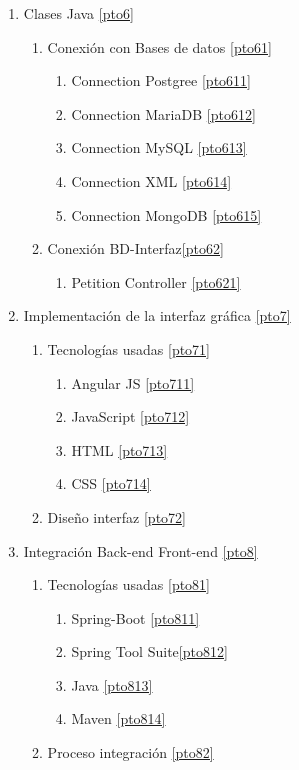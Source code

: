 \documentclass[12pt,a4paper]{article}
\begin{document}
\begin{enumerate}
\item Clases Java \ref{pto6}
	\begin{enumerate}[label*=\arabic*.]
	\item Conexión con Bases de datos \ref{pto61}
		\begin{enumerate}[label*=\arabic*.]
		\item Connection Postgree \ref{pto611}
		\item Connection MariaDB \ref{pto612}
		\item Connection MySQL \ref{pto613}
		\item Connection XML \ref{pto614}
		\item Connection MongoDB \ref{pto615}
		\end{enumerate}
	\item Conexión BD-Interfaz\ref{pto62}
		\begin{enumerate}[label*=\arabic*.]
		\item Petition Controller \ref{pto621}
		\end{enumerate}
	\end{enumerate}

\item Implementación de la interfaz gráfica  \ref{pto7}
		\begin{enumerate}[label*=\arabic*.]
		\item Tecnologías usadas \ref{pto71}
			\begin{enumerate}[label*=\arabic*.]
			\item Angular JS \ref{pto711}
			\item JavaScript \ref{pto712}
			\item HTML \ref{pto713}
			\item CSS \ref{pto714}
			\end{enumerate}
		\item Diseño interfaz \ref{pto72}
			
		\end{enumerate}

\item Integración Back-end Front-end \ref{pto8}
	\begin{enumerate}[label*=\arabic*.]
	\item Tecnologías usadas \ref{pto81}
		\begin{enumerate}[label*=\arabic*.]
			\item Spring-Boot \ref{pto811}
			\item Spring Tool Suite\ref{pto812}
			\item Java \ref{pto813}
			\item Maven \ref{pto814}
		\end{enumerate}
	\item Proceso integración \ref{pto82}
	\end{enumerate}




\end{enumerate}
\end{document}
